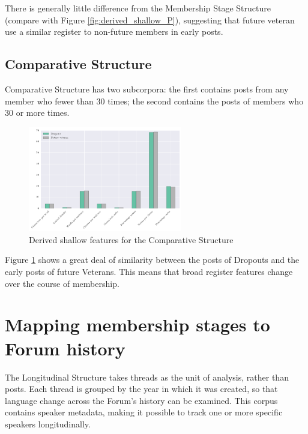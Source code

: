 There is generally little difference from the Membership Stage Structure (compare with Figure \ref{fig:derived_shallow_P}), suggesting that future veteran  use a similar register to non\hyp{}future \glspl{member} in early \glspl{post}.

\subsection{Comparative Structure}

Comparative Structure has two subcorpora: the first contains \glspl{post} from any \gls{member} who  fewer than 30 times; the second contains the \glspl{post} of members who  30 or more times.

\begin{figure}[htb]
\centering
\includegraphics[width=0.6\textwidth]{../images/derived-shallow-features-in-C-corpus.png}
\caption{Derived shallow features for the Comparative Structure}
\label{fig:derived_shallow_C}
\end{figure}

Figure \ref{fig:derived_shallow_C} shows a great deal of similarity between the \glspl{post} of Dropouts and the early \glspl{post} of future Veterans. This means that broad register features change over the course of membership.

\section{Mapping membership stages to Forum history}

The Longitudinal Structure takes \glspl{thread} as the unit of analysis, rather than \glspl{post}. Each \gls{thread} is grouped by the year in which it was created, so that language change across the \gls{Forum}'s history can be examined. This corpus contains speaker metadata, making it possible to track one or more specific speakers longitudinally.

